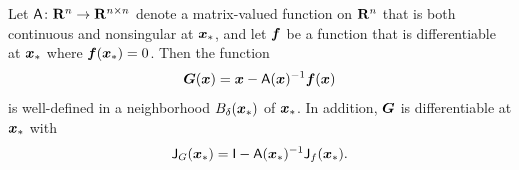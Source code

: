 \begin{lemma}
    \label{lemma:lemma_newton_raphson}
    Let $\mathsf A\colon \mathbf R^n \to \mathbf R^{n \times n}$ denote a matrix-valued function on $\mathbf R^n$ that is both continuous and nonsingular at $\mathbf{\boldsymbol{x}}_*$,
    and let $\mathbf{\boldsymbol{f}}$ be a function that is differentiable at $\mathbf{\boldsymbol{x}}_*$ where $\mathbf{\boldsymbol{f}}(\mathbf{\boldsymbol{x}}_*) = 0$.
    Then the function
    \[
        \mathbf{\boldsymbol{G}}(\mathbf{\boldsymbol{x}}) = \mathbf{\boldsymbol{x}} - \mathsf A(\mathbf{\boldsymbol{x}})^{-1} \mathbf{\boldsymbol{f}}(\mathbf{\boldsymbol{x}})
    \]
    is well-defined in a neighborhood $B_{\delta}(\mathbf{\boldsymbol{x}}_*)$ of $\mathbf{\boldsymbol{x}}_*$.
    In addition, $\mathbf{\boldsymbol{G}}$ is differentiable at $\mathbf{\boldsymbol{x}}_*$ with
    \begin{align}
        \label{eq:jacobian_G}
        \mathsf J_G(\mathbf{\boldsymbol{x}}_*) = \mathsf I - \mathsf A(\mathbf{\boldsymbol{x}}_*)^{-1} \mathsf J_f(\mathbf{\boldsymbol{x}}_*).
    \end{align}
\end{lemma}
